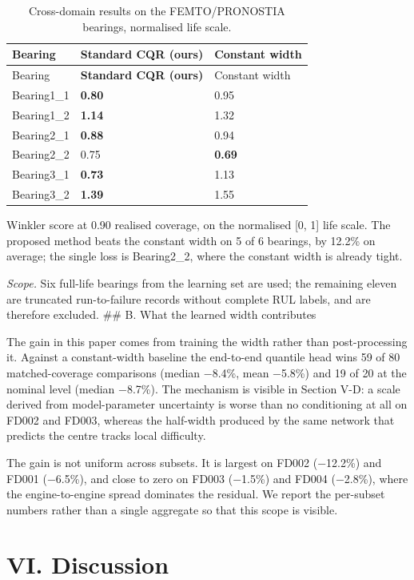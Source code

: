 \begin{longtable}[]{@{}lll@{}}
\caption{Cross-domain results on the FEMTO/PRONOSTIA bearings, normalised life scale.}\tabularnewline
\toprule\noalign{}
Bearing & \textbf{Standard CQR (ours)} & Constant width \\
\midrule\noalign{}
\endfirsthead
\toprule\noalign{}
Bearing & \textbf{Standard CQR (ours)} & Constant width \\
\midrule\noalign{}
\endhead
\bottomrule\noalign{}
\endlastfoot
Bearing1\_1 & \textbf{0.80} & 0.95 \\
Bearing1\_2 & \textbf{1.14} & 1.32 \\
Bearing2\_1 & \textbf{0.88} & 0.94 \\
Bearing2\_2 & 0.75 & \textbf{0.69} \\
Bearing3\_1 & \textbf{0.73} & 1.13 \\
Bearing3\_2 & \textbf{1.39} & 1.55 \\
\end{longtable}

Winkler score at 0.90 realised coverage, on the normalised {[}0, 1{]} life scale. The proposed method beats the constant width on 5 of 6 bearings, by 12.2\% on average; the single loss is Bearing2\_2, where the constant width is already tight.

\emph{Scope.} Six full-life bearings from the learning set are used; the remaining eleven are truncated run-to-failure records without complete RUL labels, and are therefore excluded.
\#\# B. What the learned width contributes

The gain in this paper comes from training the width rather than post-processing it. Against a constant-width baseline the end-to-end quantile head wins 59 of 80 matched-coverage comparisons (median −8.4\%, mean −5.8\%) and 19 of 20 at the nominal level (median −8.7\%). The mechanism is visible in Section V-D: a scale derived from model-parameter uncertainty is worse than no conditioning at all on FD002 and FD003, whereas the half-width produced by the same network that predicts the centre tracks local difficulty.

The gain is not uniform across subsets. It is largest on FD002 (−12.2\%) and FD001 (−6.5\%), and close to zero on FD003 (−1.5\%) and FD004 (−2.8\%), where the engine-to-engine spread dominates the residual. We report the per-subset numbers rather than a single aggregate so that this scope is visible.

\section{VI. Discussion}\label{vi.-discussion}

